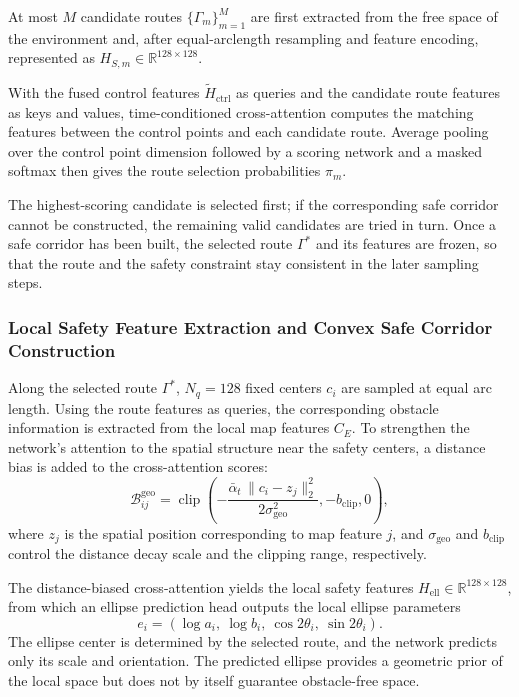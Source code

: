 \documentclass[journal]{IEEEtran}
\newcommand{\R}{\mathbb{R}}
\newcommand{\ctrlf}{\widetilde{H}_{\mathrm{ctrl}}}
\newcommand{\hell}{H_{\mathrm{ell}}}
\newcommand{\abar}{\bar{\alpha}}
\begin{document}
At most $M$ candidate routes $\{\Gamma_m\}_{m=1}^{M}$ are first extracted from
the free space of the environment and, after equal-arclength resampling and
feature encoding, represented as $H_{S,m}\in\R^{128\times128}$.

With the fused control features $\ctrlf$ as queries and the candidate route
features as keys and values, time-conditioned cross-attention computes the
matching features between the control points and each candidate route. Average
pooling over the control point dimension followed by a scoring network and a
masked softmax then gives the route selection probabilities $\pi_m$.

The highest-scoring candidate is selected first; if the corresponding safe
corridor cannot be constructed, the remaining valid candidates are tried in
turn. Once a safe corridor has been built, the selected route $\Gamma^*$ and
its features are frozen, so that the route and the safety constraint stay
consistent in the later sampling steps.

\subsubsection{Local Safety Feature Extraction and Convex Safe Corridor Construction}

Along the selected route $\Gamma^*$, $N_q=128$ fixed centers $c_i$ are sampled
at equal arc length. Using the route features as queries, the corresponding
obstacle information is extracted from the local map features $C_E$. To
strengthen the network's attention to the spatial structure near the safety
centers, a distance bias is added to the cross-attention scores:
\begin{equation}
\mathcal B_{ij}^{\mathrm{geo}}
=\operatorname{clip}\!\left(
-\frac{\abar_t\,\lVert c_i-z_j\rVert_2^2}
{2\sigma_{\mathrm{geo}}^2},
-b_{\mathrm{clip}},0\right),
\end{equation}
where $z_j$ is the spatial position corresponding to map feature $j$, and
$\sigma_{\mathrm{geo}}$ and $b_{\mathrm{clip}}$ control the distance decay
scale and the clipping range, respectively.

The distance-biased cross-attention yields the local safety features
$\hell\in\R^{128\times128}$, from which an ellipse prediction head outputs the
local ellipse parameters
\begin{equation}
e_i=(\log a_i,\ \log b_i,\ \cos 2\theta_i,\ \sin 2\theta_i).
\end{equation}
The ellipse center is determined by the selected route, and the network predicts
only its scale and orientation. The predicted ellipse provides a geometric
prior of the local space but does not by itself guarantee obstacle-free space.
\end{document}
